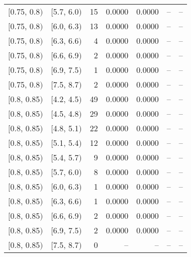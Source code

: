 \begin{longtable}{| l | l | r | r | r | r | r |}
        $[$0.75, 0.8$)$ & $[$5.7, 6.0$)$ & 15  & 0.0000 & 0.0000 & -- & -- \\
        $[$0.75, 0.8$)$ & $[$6.0, 6.3$)$ & 13  & 0.0000 & 0.0000 & -- & -- \\
        $[$0.75, 0.8$)$ & $[$6.3, 6.6$)$ & 4   & 0.0000 & 0.0000 & -- & -- \\
        $[$0.75, 0.8$)$ & $[$6.6, 6.9$)$ & 2   & 0.0000 & 0.0000 & -- & -- \\
        $[$0.75, 0.8$)$ & $[$6.9, 7.5$)$ & 1   & 0.0000 & 0.0000 & -- & -- \\
        $[$0.75, 0.8$)$ & $[$7.5, 8.7$)$ & 2   & 0.0000 & 0.0000 & -- & -- \\
        $[$0.8, 0.85$)$ & $[$4.2, 4.5$)$ & 49  & 0.0000 & 0.0000 & -- & -- \\
        $[$0.8, 0.85$)$ & $[$4.5, 4.8$)$ & 29  & 0.0000 & 0.0000 & -- & -- \\
        $[$0.8, 0.85$)$ & $[$4.8, 5.1$)$ & 22  & 0.0000 & 0.0000 & -- & -- \\
        $[$0.8, 0.85$)$ & $[$5.1, 5.4$)$ & 12  & 0.0000 & 0.0000 & -- & -- \\
        $[$0.8, 0.85$)$ & $[$5.4, 5.7$)$ & 9   & 0.0000 & 0.0000 & -- & -- \\
        $[$0.8, 0.85$)$ & $[$5.7, 6.0$)$ & 8   & 0.0000 & 0.0000 & -- & -- \\
        $[$0.8, 0.85$)$ & $[$6.0, 6.3$)$ & 1   & 0.0000 & 0.0000 & -- & -- \\
        $[$0.8, 0.85$)$ & $[$6.3, 6.6$)$ & 1   & 0.0000 & 0.0000 & -- & -- \\
        $[$0.8, 0.85$)$ & $[$6.6, 6.9$)$ & 2   & 0.0000 & 0.0000 & -- & -- \\
        $[$0.8, 0.85$)$ & $[$6.9, 7.5$)$ & 2   & 0.0000 & 0.0000 & -- & -- \\
        $[$0.8, 0.85$)$ & $[$7.5, 8.7$)$ & 0   & -- & -- & -- & --  \\
\end{longtable}